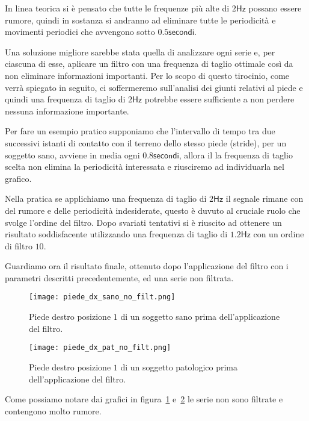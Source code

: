 In linea teorica si è pensato che tutte le frequenze più alte di $2\mathsf{Hz}$ possano essere rumore,
quindi in sostanza si andranno ad eliminare tutte le periodicità e movimenti periodici 
che avvengono sotto $0.5 \mathsf{secondi}$. 

Una soluzione migliore sarebbe stata quella di analizzare
ogni serie e, per ciascuna di esse, aplicare un filtro con una frequenza di taglio ottimale così da
non eliminare informazioni importanti. Per lo scopo di questo tirocinio, come verrà spiegato in seguito,
ci soffermeremo sull'analisi dei giunti relativi al piede e quindi una frequenza di taglio di $2\mathsf{Hz}$
potrebbe essere sufficiente a non perdere nessuna informazione importante.


Per fare un esempio pratico supponiamo che l'intervallo di tempo tra due successivi istanti di contatto con il
terreno dello stesso piede (stride), per un soggetto sano, avviene in media ogni $0.8\mathsf{secondi}$,
allora il la frequenza di taglio scelta non elimina la periodicità interessata e riusciremo 
ad individuarla nel grafico.

Nella pratica se applichiamo una frequenza di taglio di $2\mathsf{Hz}$ il segnale rimane con del rumore
e delle periodicità indesiderate, questo è duvuto al cruciale ruolo che svolge l'ordine del filtro.
Dopo svariati tentativi si è riuscito ad ottenere un risultato soddisfacente utilizzando una frequenza
di taglio di $1.2\mathsf{Hz}$ con un ordine di filtro $10$.

Guardiamo ora il risultato finale, ottenuto dopo l'applicazione del filtro con i parametri descritti
precedentemente, ed una serie non filtrata.


\begin{figure}[H]
    \centering
    \texttt{[image: piede\_dx\_sano\_no\_filt.png]}
    \caption{Piede destro posizione $1$ di un soggetto sano prima dell'applicazione del filtro.}
    \label{fig:piede_dx_1_sano_no_filt}
\end{figure}

\begin{figure}[H]
    \centering
    \texttt{[image: piede\_dx\_pat\_no\_filt.png]}
    \caption{Piede destro posizione $1$ di un soggetto patologico prima dell'applicazione del filtro.}
    \label{fig:piede_dx_1_pat_no_filt}
\end{figure}

Come possiamo notare dai grafici in figura~\ref{fig:piede_dx_1_sano_no_filt} 
e~\ref{fig:piede_dx_1_pat_no_filt} le serie non sono filtrate e contengono molto rumore.

